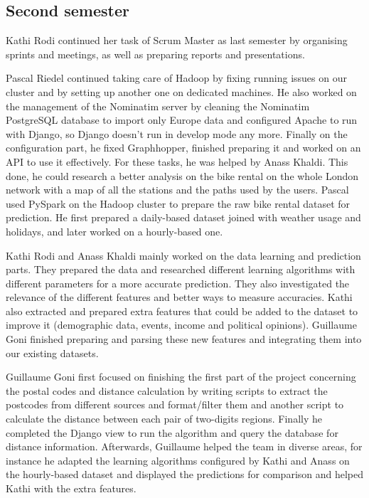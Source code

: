 \subsection{Second semester}

Kathi Rodi continued her task of Scrum Master as last semester by organising
sprints and meetings, as well as preparing reports and presentations.

Pascal Riedel continued taking care of Hadoop by fixing running issues on our
cluster and by setting up another one on dedicated machines.
He also worked on the management of the Nominatim server by cleaning the Nominatim
PostgreSQL database to import only Europe data and configured Apache to run with
Django, so Django doesn't run in develop mode any more.
Finally on the configuration part, he fixed Graphhopper, finished preparing it
and worked on an API to use it effectively. For these tasks, he was helped by
Anass Khaldi.
This done, he could research a better analysis on the bike rental on the whole
London network with a map of all the stations and the paths used by the users.
Pascal used PySpark on the Hadoop cluster to prepare the raw bike rental dataset
for prediction. He first prepared a daily-based dataset joined with weather usage
and holidays, and later worked on a hourly-based one.

Kathi Rodi and Anass Khaldi mainly worked on the data learning and prediction
parts. They prepared the data and researched different learning algorithms with
different parameters for a more accurate prediction. They also investigated the
relevance of the different features and better ways to measure accuracies.
Kathi also extracted and prepared extra features that could be added to the
dataset to improve it (demographic data, events, income and political opinions).
Guillaume Goni finished preparing and parsing these new features and integrating
them into our existing datasets.

Guillaume Goni first focused on finishing the first part of the project concerning
the postal codes and distance calculation by writing scripts to extract the
postcodes from different sources and format/filter them and another script to
calculate the distance between each pair of two-digits regions. Finally he
completed the Django view to run the algorithm and query the database for distance
information.
Afterwards, Guillaume helped the team in diverse areas, for instance he adapted
the learning algorithms configured by Kathi and Anass on the hourly-based dataset
and displayed the predictions for comparison and helped Kathi with the extra
features.

